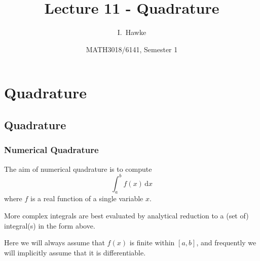 \documentclass{beamer}
\title[Lecture 11] %
{Lecture 11 - Quadrature}
\author[I. Hawke] %
{I.~Hawke}
\institute[University of Southampton] %
{
  School of Mathematics, \\
  University of Southampton, UK
}
\date[Semester 1] %
{MATH3018/6141, Semester 1}
\begin{document}
\begin{frame}
  \titlepage
\end{frame}

\section{Quadrature}

\subsection{Quadrature}

\begin{frame}
  \frametitle{Numerical Quadrature}

  The aim of numerical quadrature is to compute
  \begin{equation*}
    \int_a^b f(x) \, \text{d}x
  \end{equation*}
  where $f$ is a real function of a single variable $x$. \pause

  \vspace{1ex}

  More complex integrals are best evaluated by analytical reduction to
  a (set of) integral(s) in the form above. \pause

  \vspace{1ex}

  Here we will always assume that $f(x)$ is finite within $[a, b]$,
  and frequently we will implicitly assume that it is differentiable.

\end{frame}
\end{document}
